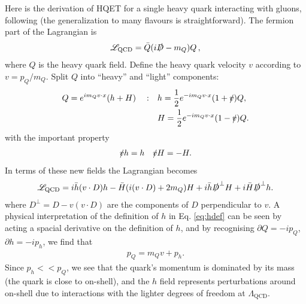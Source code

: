 Here is the derivation of HQET for a single heavy quark interacting with gluons, following \cite{Neubert:2005mu} (the generalization to many flavours is straightforward). The fermion part of the Lagrangian is
\begin{align}
  \mathscr{L}_{\text{QCD}} = \bar{Q} ( i\slashed{D} - m_Q ) Q\,,
  \label{eq:dirac}
\end{align}
where $Q$ is the heavy quark field. Define the heavy quark velocity $v$ according to $v = p_Q/m_Q$. Split $Q$ into ``heavy'' and ``light'' components:
\begin{align}
  \label{eq:hdef}
  Q = e^{im_Q v\cdot x}(h + H)\quad : \quad &h = {1\over 2} e^{-im_Q v\cdot x} ( 1 + \slashed{v} ) Q, \\
  &H = {1\over 2} e^{-im_Q v\cdot x} ( 1 - \slashed{v} ) Q.
\end{align}
with the important property
\begin{align}
  \slashed{v} h = h \quad \slashed{v} H = - H.
\end{align}
In terms of these new fields the Lagrangian becomes
\begin{align}
  \mathscr{L}_{\text{QCD}} = i\bar{h} (v\cdot D) h - \bar{H} ( i(v\cdot D) + 2m_Q ) H
  + i \bar{h} \slashed{D}^{\perp} H + i \bar{H} \slashed{D}^{\perp} h.
  \label{eq:HQET_preintegral}
\end{align}
where $D^{\perp} = D - v(v\cdot D)$ are the components of $D$ perpendicular to $v$. %
A physical interpretation of the definition of $h$ in Eq. \eqref{eq:hdef} can be seen by acting a spacial derivative on the definition of $h$, and by recognising $\partial Q = -i p_Q$, $\partial h = -i p_h$, we find that
\begin{align}
  p_Q = m_Q v + p_h.
\end{align}
Since $p_h << p_Q$, we see that the quark's momentum is dominated by its mass (the quark is close to on-shell), and the $h$ field represents perturbations around on-shell due to interactions with the lighter degrees of freedom at $\Lambda_{\text{QCD}}$.

